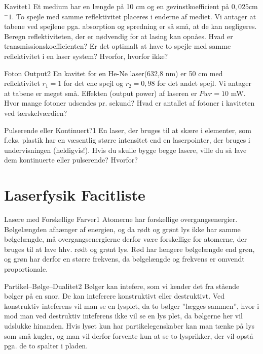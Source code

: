 \begin{opgave}{Kavitet}{1}
Et medium har en længde på 10 cm og en gevinstkoefficient på $0,025$cm$^-1$. To spejle med samme reflektivitet placeres i enderne af mediet. Vi antager at tabene ved spejlene pga. absorption og spredning er så små, at de kan negligeres. 
\opg Beregn reflektiviteten, der er nødvendig for at lasing kan opnåes. 
\opg Hvad er transmissionskoefficienten? 
\opg Er det optimalt at have to spejle med samme reflektivitet i en laser system? Hvorfor, hvorfor ikke?
\end{opgave}

\begin{opgave}{Foton Output}{2}
En kavitet for en He-Ne laser(632,8 nm) er 50 cm med reflektivitet $r_1=1$ for det ene spejl og $r_2=0,98$ for det andet spejl. Vi antager at tabene er meget små. Effekten (output power) af laseren er $Pwr = 10$ mW. 
\opg Hvor mange fotoner udsendes pr. sekund?
\opg Hvad er antallet af fotoner i kaviteten ved tærskelværdien?
\end{opgave}

\begin{opgave}{Pulserende eller Kontinuert?}{1}
En laser, der bruges til at skære i elementer, som f.eks. plastik har en væsentlig større intensitet end en laserpointer, der bruges i undervisningen (heldigvis!).
\opg Hvis du skulle bygge begge lasere, ville du så lave dem kontinuerte eller pulserende? Hvorfor?
\end{opgave}

\newpage


\chapter{Laserfysik Facitliste}

\begin{opgave}{Lasere med Forskellige Farver}{1}
\opg Atomerne har forskellige overgangsenergier. Bølgelængden afhænger af energien, og da rødt og grønt lys ikke har samme bølgelængde, må overgangsenergierne derfor være forskellige for atomerne, der bruges til at lave hhv. rødt og grønt lys. 
\opg Rød har længere bølgelængde end grøn, og grøn har derfor en større frekvens, da bølgelængde og frekvens er omvendt proportionale. 
\end{opgave}

\begin{opgave}{Partikel--Bølge--Dualitet}{2}
\opg Bølger kan intefere, som vi kender det fra stående bølger på en snor. De kan inteferere konstruktivt eller destruktivt. Ved konstruktiv inteferens vil man se en lysplet, da to bølger ''lægges sammen'', hvor i mod man ved destruktiv inteferens ikke vil se en lys plet, da bølgerne her vil udslukke hinanden. 
\opg Hvis lyset kun har partikelegenskaber kan man tænke på lys som små kugler, og man vil derfor forvente kun at se to lysprikker, der vil opstå pga. de to spalter i pladen. 
\end{opgave}

